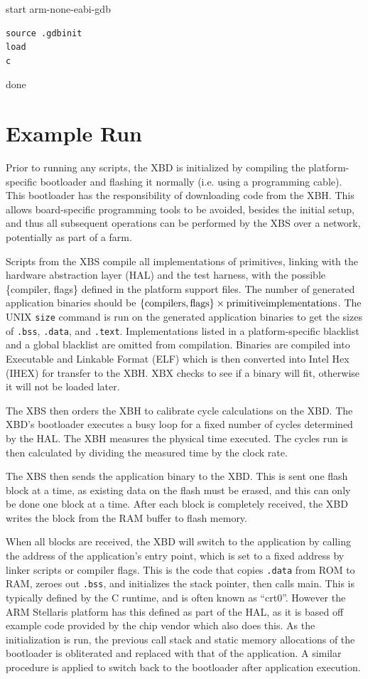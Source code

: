 \documentclass[twoside,11pt]{cergdoc}
\begin{document}
start
arm-none-eabi-gdb

\begin{lstlisting}
source .gdbinit
load
c
\end{lstlisting}

done

  \section{Example Run}
Prior to running any scripts, the XBD is initialized by compiling the
platform-specific bootloader and flashing it normally (i.e. using a programming
cable). 
This bootloader has the responsibility of downloading code from the XBH. This allows board-specific
programming tools to be avoided, besides the initial setup, and thus all
subsequent operations can be performed by the XBS over a network, potentially as
part of a farm.

Scripts from the XBS compile all implementations of primitives, linking with
the hardware abstraction layer (HAL) and the test harness, with the possible
\{compiler, flags\} defined in the platform support files. The number of generated
application binaries should be $\{\rm{compilers,flags}\}\times\rm{primitive
implementations}$. The UNIX \texttt{size} command is run on the generated
application binaries to get the sizes of
\texttt{.bss}, \texttt{.data}, and \texttt{.text}. Implementations listed in a
platform-specific blacklist and a global blacklist are omitted from compilation.
Binaries are compiled into Executable and Linkable Format (ELF) which is then
converted into Intel Hex (IHEX) for transfer to the XBH. XBX checks to see if
a binary will fit, otherwise it will not be loaded later.

The XBS then orders the XBH to calibrate cycle calculations on the XBD. The
XBD's bootloader executes a busy loop for a fixed number of cycles determined by
the HAL. The XBH measures the physical time executed. The cycles run is then
calculated by dividing the measured time by the clock rate.

The XBS then sends the application binary to the XBD. This is sent one flash
block at a time, as existing data on the flash must be erased, and this can only
be done one block at a time. After each block is completely received, the XBD
writes the block from the RAM buffer to flash
memory. 

When all blocks are received, the XBD will switch to the application by
calling the address of the application's entry point, which is set to a fixed
address by linker scripts or compiler flags. This is the code
that copies \texttt{.data} from ROM to RAM, zeroes out \texttt{.bss}, and
initializes the stack pointer, then calls main. This is typically defined by the
C runtime, and is often known as ``crt0''. However the ARM Stellaris platform has
this defined as part of the HAL, as it is based off example code provided by the
chip vendor which also does this. As the initialization is run, the previous
call stack and static memory allocations of the bootloader is obliterated and
replaced with that of the application. A similar procedure is applied to switch
back to the bootloader after application execution. 
\end{document}
